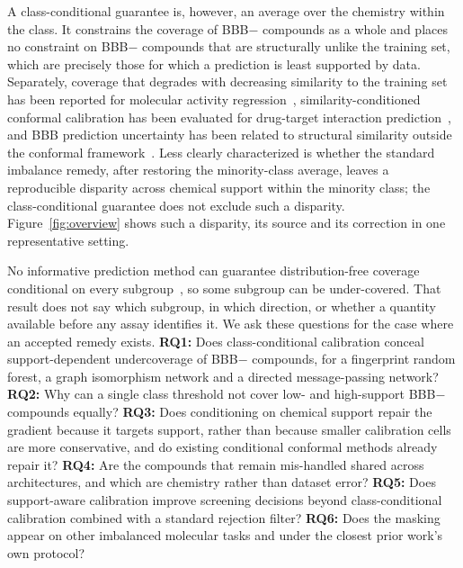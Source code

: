 \documentclass[10pt]{article}
\begin{document}
A class-conditional guarantee is, however, an average over the chemistry within the class. It constrains the coverage of BBB$-$ compounds as a whole and places no constraint on BBB$-$ compounds that are structurally unlike the training set, which are precisely those for which a prediction is least supported by data. Separately, coverage that degrades with decreasing similarity to the training set has been reported for molecular activity regression~\cite{guo2026scaffold}, similarity-conditioned conformal calibration has been evaluated for drug-target interaction prediction~\cite{rakhshaninejad2025dti}, and BBB prediction uncertainty has been related to structural similarity outside the conformal framework~\cite{tong2022bbbuq}. Less clearly characterized is whether the standard imbalance remedy, after restoring the minority-class average, leaves a reproducible disparity across chemical support within the minority class; the class-conditional guarantee does not exclude such a disparity. Figure~\ref{fig:overview} shows such a disparity, its source and its correction in one representative setting.

No informative prediction method can guarantee distribution-free coverage conditional on every subgroup~\cite{barber2021limits}, so some subgroup can be under-covered. That result does not say which subgroup, in which direction, or whether a quantity available before any assay identifies it. We ask these questions for the case where an accepted remedy exists. \textbf{RQ1:} Does class-conditional calibration conceal support-dependent undercoverage of BBB$-$ compounds, for a fingerprint random forest, a graph isomorphism network and a directed message-passing network? \textbf{RQ2:} Why can a single class threshold not cover low- and high-support BBB$-$ compounds equally? \textbf{RQ3:} Does conditioning on chemical support repair the gradient because it targets support, rather than because smaller calibration cells are more conservative, and do existing conditional conformal methods already repair it? \textbf{RQ4:} Are the compounds that remain mis-handled shared across architectures, and which are chemistry rather than dataset error? \textbf{RQ5:} Does support-aware calibration improve screening decisions beyond class-conditional calibration combined with a standard rejection filter? \textbf{RQ6:} Does the masking appear on other imbalanced molecular tasks and under the closest prior work's own protocol?
\end{document}

